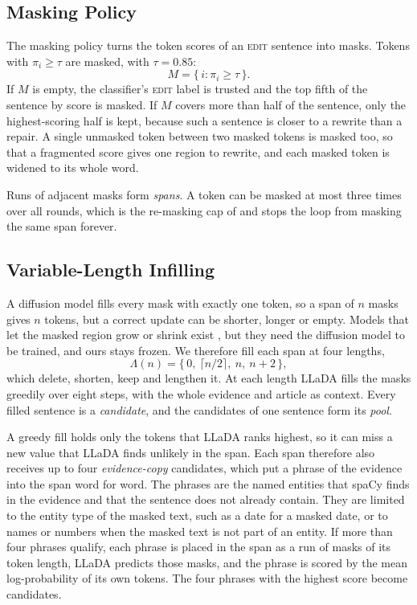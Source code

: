\documentclass[11pt]{article}
\newcommand{\edit}{\textsc{edit}}
\begin{document}
\subsection{Masking Policy}
The masking policy turns the token scores of an \edit{} sentence into masks. Tokens with $\pi_i \ge \tau$ are masked, with $\tau = 0.85$:
\begin{equation}
M = \{\, i : \pi_i \ge \tau \,\}.
\end{equation}
If $M$ is empty, the classifier's \edit{} label is trusted and the top fifth of the sentence by score is masked. If $M$ covers more than half of the sentence, only the highest-scoring half is kept, because such a sentence is closer to a rewrite than a repair. A single unmasked token between two masked tokens is masked too, so that a fragmented score gives one region to rewrite, and each masked token is widened to its whole word.

Runs of adjacent masks form \emph{spans}. A token can be masked at most three times over all rounds, which is the re-masking cap of \citet{yao-2026-remask} and stops the loop from masking the same span forever.

\subsection{Variable-Length Infilling}
A diffusion model fills every mask with exactly one token, so a span of $n$ masks gives $n$ tokens, but a correct update can be shorter, longer or empty. Models that let the masked region grow or shrink exist \citep{wu-etal-2026-dreamon, zhang-etal-2025-ddot}, but they need the diffusion model to be trained, and ours stays frozen. We therefore fill each span at four lengths,
\begin{equation}
\Lambda(n) = \{\,0,\ \lceil n/2\rceil,\ n,\ n+2\,\},
\end{equation}
which delete, shorten, keep and lengthen it. At each length LLaDA fills the masks greedily over eight steps, with the whole evidence and article as context. Every filled sentence is a \emph{candidate}, and the candidates of one sentence form its \emph{pool}.

A greedy fill holds only the tokens that LLaDA ranks highest, so it can miss a new value that LLaDA finds unlikely in the span. Each span therefore also receives up to four \emph{evidence-copy} candidates, which put a phrase of the evidence into the span word for word. The phrases are the named entities that spaCy finds in the evidence and that the sentence does not already contain. They are limited to the entity type of the masked text, such as a date for a masked date, or to names or numbers when the masked text is not part of an entity. If more than four phrases qualify, each phrase is placed in the span as a run of masks of its token length, LLaDA predicts those masks, and the phrase is scored by the mean log-probability of its own tokens. The four phrases with the highest score become candidates.
\end{document}
